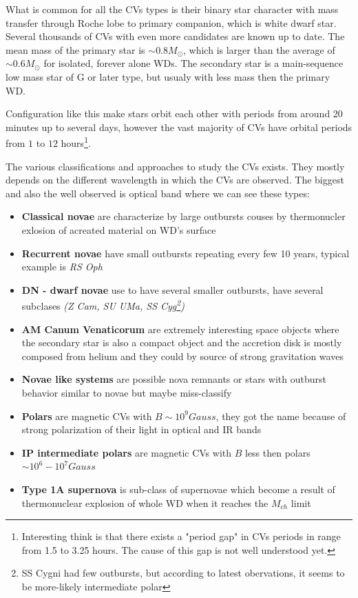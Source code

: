 \documentclass[oneside,a4paper,11pt]{report}
\begin{document}
What is common for all the CVs types is their binary star character with mass transfer through Roche lobe to primary 
companion, which is white dwarf star. Several thousands of CVs with even more candidates are known up to date. 
The mean mass of the primary star is $\sim 0.8 M_\odot$, which is larger than the average of $\sim 0.6 M_\odot$ for isolated, 
forever alone WDs.
The secondary star is a main-sequence low mass star of G or later type, but usualy with less mass then the primary WD.      

Configuration like this make stars orbit each other with periods from around 20 minutes up to several days, 
however the vast majority of CVs have orbital periods from $1$ to $12$ hours\footnote{Interesting think is that there exists a "period gap" 
in CVs periods in range from 1.5 to 3.25 hours. The cause of this gap is not well understood yet. }.

The various classifications and approaches to study the CVs exists. They mostly depends on the different wavelength in which the CVs are 
observed. The biggest and also the well observed is optical band where we can see these types: 
\begin{itemize}
 \item \textbf{Classical novae} are characterize by large outbursts couses by thermonucler exlosion of acreated material on WD's surface
 \item \textbf{Recurrent novae} have small outbursts repeating every few 10 years, typical example is \textit{RS Oph}
 \item \textbf{DN - dwarf novae} use to have several smaller outbursts, have several subclases \textit{(Z Cam, SU UMa, SS Cyg\footnote{SS Cygni had few 
outbursts, but according to latest obervations, it seems to be more-likely intermediate polar})} 
 \item \textbf{AM Canum Venaticorum} are extremely interesting space objects where the secondary star is also a compact object and the accretion 
disk is mostly composed from helium and they could by source of strong gravitation waves 
 \item \textbf{Novae like systems} are possible nova remnants or stars with outburst behavior similar to novae but maybe miss-classify
 \item \textbf{Polars} are magnetic CVs with $B \sim 10^9 Gauss$, they got the name because of strong polarization of their light in optical and IR bands 
 \item \textbf{IP intermediate polars} are magnetic CVs with $B$ less then polars $\sim10^6-10^7 Gauss$ 
 \item \textbf{Type 1A supernova} is sub-class of supernovae which become a result of thermonuclear explosion of whole WD when it reaches the $M_{ch}$ limit  
\end{itemize}
\end{document}
